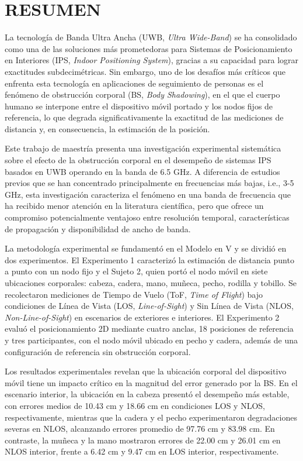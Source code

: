 \chapter*{RESUMEN}

La tecnología de Banda Ultra Ancha (UWB, \textit{Ultra Wide-Band}) se ha consolidado como una de las soluciones más prometedoras para Sistemas de Posicionamiento en Interiores (IPS, \textit{Indoor Positioning System}), gracias a su capacidad para lograr exactitudes subdecimétricas. Sin embargo, uno de los desafíos más críticos que enfrenta esta tecnología en aplicaciones de seguimiento de personas es el fenómeno de obstrucción corporal (BS, \textit{Body Shadowing}), en el que el cuerpo humano se interpone entre el dispositivo móvil portado y los nodos fijos de referencia, lo que degrada significativamente la exactitud de las mediciones de distancia y, en consecuencia, la estimación de la posición.

Este trabajo de maestría presenta una investigación experimental sistemática sobre el efecto de la obstrucción corporal en el desempeño de sistemas IPS basados en UWB operando en la banda de 6.5 GHz. A diferencia de estudios previos que se han concentrado principalmente en frecuencias más bajas, i.e., 3-5 GHz, esta investigación caracteriza el fenómeno en una banda de frecuencia que ha recibido menor atención en la literatura científica, pero que ofrece un compromiso potencialmente ventajoso entre resolución temporal, características de propagación y disponibilidad de ancho de banda.

La metodología experimental se fundamentó en el Modelo en V y se dividió en dos experimentos. El Experimento 1 caracterizó la estimación de distancia punto a punto con un nodo fijo y el Sujeto 2, quien portó el nodo móvil en siete ubicaciones corporales: cabeza, cadera, mano, muñeca, pecho, rodilla y tobillo. Se recolectaron mediciones de Tiempo de Vuelo (ToF, \textit{Time of Flight}) bajo condiciones de Línea de Vista (LOS, \textit{Line-of-Sight}) y Sin Línea de Vista (NLOS, \textit{Non-Line-of-Sight}) en escenarios de exteriores e interiores. El Experimento 2 evaluó el posicionamiento 2D mediante cuatro anclas, 18 posiciones de referencia y tres participantes, con el nodo móvil ubicado en pecho y cadera, además de una configuración de referencia sin obstrucción corporal.

Los resultados experimentales revelan que la ubicación corporal del dispositivo móvil tiene un impacto crítico en la magnitud del error generado por la BS. En el escenario interior, la ubicación en la cabeza presentó el desempeño más estable, con errores medios de 10.43 cm y 18.66 cm en condiciones LOS y NLOS, respectivamente, mientras que la cadera y el pecho experimentaron degradaciones severas en NLOS, alcanzando errores promedio de 97.76 cm y 83.98 cm. En contraste, la muñeca y la mano mostraron errores de 22.00 cm y 26.01 cm en NLOS interior, frente a 6.42 cm y 9.47 cm en LOS interior, respectivamente.

